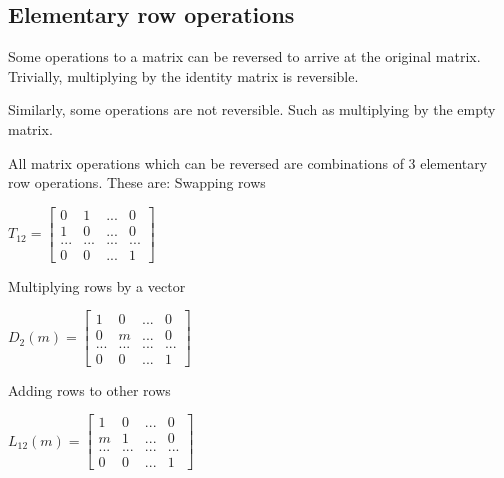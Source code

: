 
\subsection{Elementary row operations}

Some operations to a matrix can be reversed to arrive at the original matrix. Trivially, multiplying by the identity matrix is reversible.

Similarly, some operations are not reversible. Such as multiplying by the empty matrix.

All matrix operations which can be reversed are combinations of \(3\) elementary row operations. These are:
Swapping rows

$T_{12}=\begin{bmatrix}0& 1&...&0\\1 & 0&...&0\\...&...&...&...\\0&0&...&1\end{bmatrix}$

Multiplying rows by a vector

$D_2(m)=\begin{bmatrix}1& 0&...&0\\0 & m&...&0\\...&...&...&...\\0&0&...&1\end{bmatrix}$

Adding rows to other rows

$L_{12}(m)=\begin{bmatrix}1& 0&...&0\\m & 1&...&0\\...&...&...&...\\0&0&...&1\end{bmatrix}$
